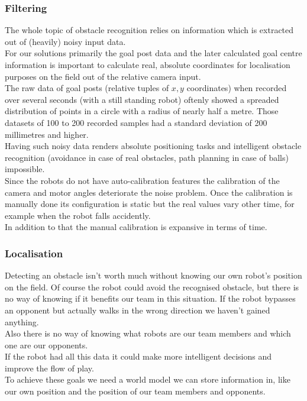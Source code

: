 \documentclass[lnicst,a4paper]{svmultln}
\begin{document}
\subsubsection{Filtering}
The whole topic of obstacle recognition relies on information which is extracted out of (heavily) noisy input data.
\\
For our solutions primarily the goal post data and the later calculated goal centre information is important to calculate real, absolute coordinates for localisation purposes on the field out of the relative camera input.
\\
The raw data of goal posts (relative tuples of $x, y$ coordinates) when recorded over several seconds (with a still standing robot) oftenly showed a spreaded distribution of points in a circle with a radius of nearly half a metre. Those datasets of 100 to 200 recorded samples had a standard deviation of 200 millimetres and higher.
\\
Having such noisy data renders absolute positioning tasks and intelligent obstacle recognition (avoidance in case of real obstacles, path planning in case of balls) impossible.
\\
Since the robots do not have auto-calibration features the calibration of the camera and motor angles deteriorate the noise problem. Once the calibration is manually done its configuration is static but the real values vary other time, for example when the robot falls accidently.
\\
In addition to that the manual calibration is expansive in terms of time.

\subsubsection{Localisation}
Detecting an obstacle isn't worth much without knowing our own robot's position on the field. Of course the robot could avoid the recognised obstacle, but there is no way of knowing if it benefits our team in this situation. If the robot bypasses an opponent but actually walks in the wrong direction we haven't gained anything. 
\\
Also there is no way of knowing what robots are our team members and which one are our opponents.
\\
If the robot had all this data it could make more intelligent decisions and improve the flow of play.
\\
To achieve these goals we need a world model we can store information in, like our own position and the position of our team members and opponents.
\end{document}
